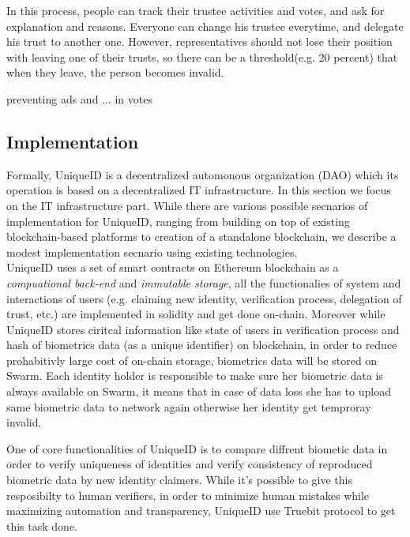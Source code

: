 \documentclass[conference]{IEEEtran}
\begin{document}
In this process, people can track their trustee activities and votes, and ask for explanation and reasons. Everyone can change his trustee everytime, and delegate his trust to another one. However, representatives should not lose their position with leaving one of their trusts, so there can be a threshold(e.g. 20 percent) that when they leave, the person becomes invalid. 


preventing ads and ... in votes\\

\subsection{Implementation}
Formally, UniqueID is a decentralized automonous organization (DAO) which its operation is based on a decentralized IT infrastructure. In this section we focus on the IT infrastructure part. While there are various possible secnarios of implementation for UniqueID, ranging from building on top of existing blockchain-based platforms to creation of a standalone blockchain, we describe a modest implementation secnario using existing technologies.\\

UniqueID uses a set of smart contracts on Ethereum blockchain as a \textit{compuational back-end} and \textit{immutable storage}, all the functionalies of system and interactions of users (e.g. claiming new identity, verification process, delegation of trust, etc.) are implemented in solidity and get done on-chain. Moreover while UniqueID stores ciritcal information like state of users in verification process and hash of biometrics data (as a unique identifier) on blockchain, in order to reduce prohabitivly large cost of on-chain storage, biometrics data will be stored on Swarm. Each identity holder is responsible to make sure her biometric data is always available on Swarm, it means that in case of data loss she has to upload same biometric data to network again otherwise her identity get temproray invalid.

One of core functionalities of UniqueID is to compare diffrent biometic data in order to verify uniqueness of identities and verify consistency of reproduced biometric data by new identity claimers. While it's possible to give this resposibilty to human verifiers, in order to minimize human mistakes while maximizing automation and transparency, UniqueID use Truebit \cite{Truebit} protocol to get this task done. 
\end{document}
